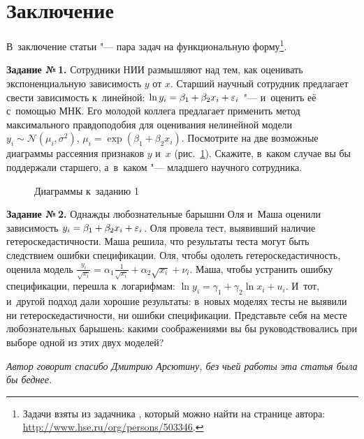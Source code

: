 \documentclass[final,pdftex]{../../template/epsilonj}
\begin{document}
\section{Заключение}

В~заключение статьи "--- пара задач на функциональную форму\footnote{Задачи взяты из задачника \citet{FurmanovZMetr}, который можно найти на странице автора: \url{http://www.hse.ru/org/persons/503346}.}\fnnsp.

\par\medskip

\textbf{Задание №\,1.} Сотрудники НИИ размышляют над тем, как оценивать экспоненциальную зависимость $y$ от $x$. Старший научный сотрудник предлагает свести зависимость к~линейной: $\ln y_i = \beta_1 + \beta_2 x_i + \varepsilon_i$ "--- и~оценить её с~помощью МНК. Его молодой коллега предлагает применить метод максимального правдоподобия для оценивания нелинейной модели $y_i \sim \mathcal{N} (\mu_i, \sigma^2)$, $\mu_i = \exp(\beta_1 + \beta_2 x_i)$. Посмотрите на две возможные диаграммы рассеяния признаков $y$ и~$x$ (рис.~\ref{fig:diag}). Скажите, в~каком случае вы бы поддержали старшего, а~в~каком "--- младшего научного сотрудника.

\begin{figure}[htbp]
	\centering
	 \quad
	\caption{Диаграммы к~заданию 1}\label{fig:diag}
\end{figure}


\textbf{Задание №\,2.} Однажды любознательные барышни Оля и~Маша оценили зависимость $y_i = \beta_1 + \beta_2 x_i + \varepsilon_i$. Оля провела тест, выявивший наличие гетероскедастичности. Маша решила, что результаты теста могут быть следствием ошибки спецификации. Оля, чтобы одолеть гетероскедастичность, оценила модель $\frac{y_i}{\sqrt{x_i}} = \alpha_1 \frac{1}{\sqrt{x_i}} + \alpha_2 \sqrt{x_i} + \nu_i$. Маша, чтобы устранить ошибку спецификации, перешла к~логарифмам: $\ln y_i = \gamma_1 + \gamma_2 \ln x_i + u_i$. И~тот, и~другой подход дали хорошие результаты: в~новых моделях тесты не выявили ни гетероскедастичности, ни ошибки спецификации. Представьте себя на месте любознательных барышень: какими соображениями вы бы руководствовались при выборе одной из этих двух моделей?

\textit{Автор говорит спасибо Дмитрию Арсютину, без чьей работы эта статья была бы беднее.}

\nocite{sakia92}	

\printbibliography	
	
\end{document}
